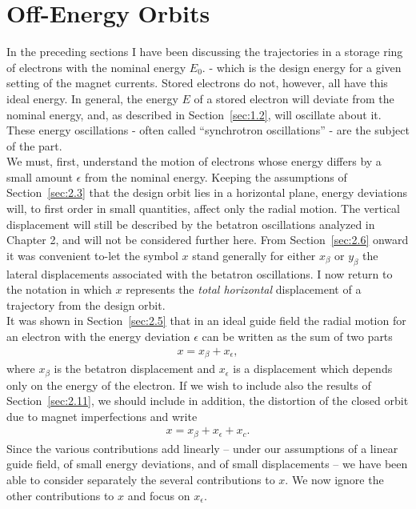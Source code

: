 \section{Off-Energy Orbits}\label{sec:3.1}

In the preceding sections I have been discussing the trajectories in a storage ring of electrons with the nominal energy $E_0$. - which is the design energy for a given setting of the magnet currents. Stored electrons do not, however, all have this ideal energy. In general, the energy $E$ of a stored electron will deviate from the nominal energy, and, as described in Section~\ref{sec:1.2}, will oscillate about it. These energy oscillations - often called “synchrotron oscillations” - are the subject of the part.\\
We must, first, understand the motion of electrons whose energy differs by a small amount $\epsilon$ from the nominal energy. Keeping the assumptions of Section~\ref{sec:2.3} that the design orbit lies in a horizontal plane, energy deviations will, to first order in small quantities, affect only the radial motion. The vertical displacement will still be described by the betatron oscillations analyzed in Chapter 2, and will not be considered further here. From Section~\ref{sec:2.6} onward it was convenient to-let the symbol $x$ stand generally for either $x_\beta$ or $y_\beta$ the lateral displacements associated with the betatron oscillations. I now return to the notation in which $x$ represents the \emph{total horizontal} displacement of a trajectory from the design orbit.\\
It was shown in Section~\ref{sec:2.5} that in an ideal guide field the radial motion for
an electron with the energy deviation $\epsilon$ can be written as the sum of two parts
\begin{align}
	x = x_\beta+x_\epsilon,
\end{align}
where $x_\beta$ is the betatron displacement and $x_\epsilon$ is a displacement which depends
only on the energy of the electron. If we wish to include also the results of Section~\ref{sec:2.11}, we should include in addition, the distortion of the closed orbit due to magnet imperfections and write
\begin{align}
	x = x_\beta+x_\epsilon+x_c.
\end{align}
Since the various contributions add linearly -- under our assumptions of a linear guide field, of
 small energy deviations, and of small displacements -- we have been able to consider separately
 the several contributions to $x$. We now ignore the other contributions to $x$ and focus on $x_\epsilon$.
